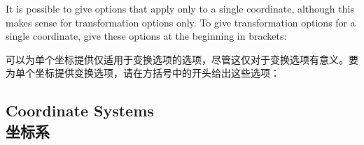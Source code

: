 It is possible to give options that apply only to a single coordinate, although
this makes sense for transformation options only. To give transformation
options for a single coordinate, give these options at the beginning in
brackets:

可以为单个坐标提供仅适用于变换选项的选项，尽管这仅对于变换选项有意义。要为单个坐标提供变换选项，请在方括号中的开头给出这些选项：

%
\begin{codeexample}[]
\end{codeexample}


\subsection{Coordinate Systems\\坐标系}

